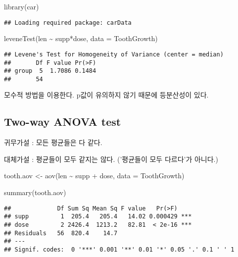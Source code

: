 \documentclass[
]{article}
\newenvironment{Shaded}{\begin{snugshade}}{\end{snugshade}}
\newcommand{\AttributeTok}[1]{\textcolor[rgb]{0.77,0.63,0.00}{#1}}
\newcommand{\FunctionTok}[1]{\textcolor[rgb]{0.00,0.00,0.00}{#1}}
\newcommand{\NormalTok}[1]{#1}
\newcommand{\OtherTok}[1]{\textcolor[rgb]{0.56,0.35,0.01}{#1}}
\newcommand{\SpecialCharTok}[1]{\textcolor[rgb]{0.00,0.00,0.00}{#1}}
\begin{document}
\begin{Shaded}
\begin{Highlighting}[]
\FunctionTok{library}\NormalTok{(car)}
\end{Highlighting}
\end{Shaded}

\begin{verbatim}
## Loading required package: carData
\end{verbatim}

\begin{Shaded}
\begin{Highlighting}[]
\FunctionTok{leveneTest}\NormalTok{(len }\SpecialCharTok{\textasciitilde{}}\NormalTok{ supp}\SpecialCharTok{*}\NormalTok{dose, }\AttributeTok{data =}\NormalTok{ ToothGrowth)}
\end{Highlighting}
\end{Shaded}

\begin{verbatim}
## Levene's Test for Homogeneity of Variance (center = median)
##       Df F value Pr(>F)
## group  5  1.7086 0.1484
##       54
\end{verbatim}

모수적 방법을 이용한다. p값이 유의하지 않기 때문에 등분산성이 있다.

\hypertarget{two-way-anova-test}{%
\subsection{Two-way ANOVA test}\label{two-way-anova-test}}

귀무가설 : 모든 평균들은 다 같다.

대체가설 : 평균들이 모두 같지는 않다. ('평균들이 모두 다르다'가 아니다.)

\begin{Shaded}
\begin{Highlighting}[]
\NormalTok{tooth.aov }\OtherTok{\textless{}{-}} \FunctionTok{aov}\NormalTok{(len }\SpecialCharTok{\textasciitilde{}}\NormalTok{ supp }\SpecialCharTok{+}\NormalTok{ dose, }\AttributeTok{data =}\NormalTok{ ToothGrowth)}

\FunctionTok{summary}\NormalTok{(tooth.aov)}
\end{Highlighting}
\end{Shaded}

\begin{verbatim}
##             Df Sum Sq Mean Sq F value   Pr(>F)    
## supp         1  205.4   205.4   14.02 0.000429 ***
## dose         2 2426.4  1213.2   82.81  < 2e-16 ***
## Residuals   56  820.4    14.7                     
## ---
## Signif. codes:  0 '***' 0.001 '**' 0.01 '*' 0.05 '.' 0.1 ' ' 1
\end{verbatim}
\end{document}
